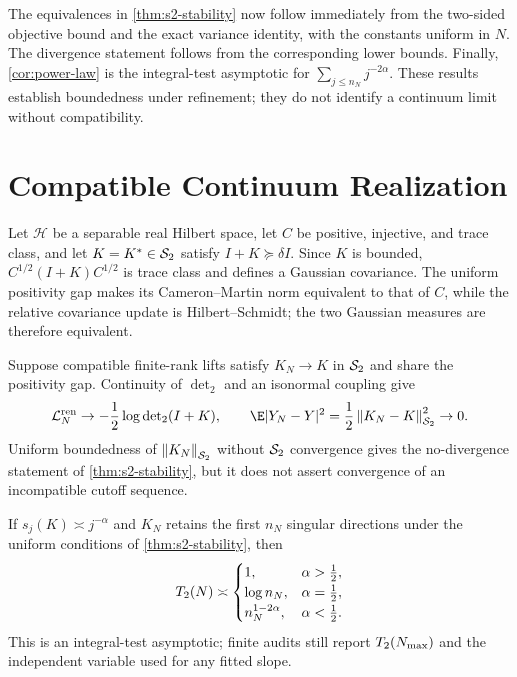 The equivalences in \cref{thm:s2-stability} now follow immediately from the
two-sided objective bound and the exact variance identity, with the constants
uniform in $N$. The divergence statement follows from the corresponding
lower bounds. Finally, \cref{cor:power-law} is the integral-test asymptotic
for $\sum_{j\le n_N}j^{-2\alpha}$. These results establish boundedness under
refinement; they do not identify a continuum limit without compatibility.


\section{Compatible Continuum Realization}
\label{app:continuum-realization}

Let $\mathcal H$ be a separable real Hilbert space, let $C$ be positive,
injective, and trace class, and let $K=K^\ast\in\mathcal{S}_{2}$ satisfy
$I+K\succeq\delta I$. Since $K$ is bounded,
$C^{1/2}(I+K)C^{1/2}$ is trace class and defines a Gaussian covariance. The
uniform positivity gap makes its Cameron--Martin norm equivalent to that of
$C$, while the relative covariance update is Hilbert--Schmidt; the two
Gaussian measures are therefore equivalent.

Suppose compatible finite-rank lifts satisfy $K_N\to K$ in $\mathcal{S}_{2}$
and share the positivity gap. Continuity of $\det_2$ and an isonormal
coupling give
\begin{equation}
  \mathcal L_N^{\mathrm{ren}}\to
  -\frac12\log\det\nolimits_2(I+K),
  \qquad
  \E|Y_N-Y|^2=\frac12\hsnorm{K_N-K}^2\to0.
  \label{eq:compatible-cutoff-convergence}
\end{equation}
Uniform boundedness of $\left\lVert K_N \right\rVert_{\mathcal{S}_{2}}$ without $\mathcal{S}_{2}$ convergence
gives the no-divergence statement of \cref{thm:s2-stability}, but it does not
assert convergence of an incompatible cutoff sequence.

\begin{corollary}
\label{cor:power-law}
If $s_j(K)\asymp j^{-\alpha}$ and $K_N$ retains the first $n_N$ singular
directions under the uniform conditions of \cref{thm:s2-stability}, then
\begin{equation}
  T_2(N)\asymp
  \begin{cases}
    1, & \alpha>\tfrac12,\\
    \log n_N, & \alpha=\tfrac12,\\
    n_N^{1-2\alpha}, & \alpha<\tfrac12.
  \end{cases}
  \label{eq:power-law-phase-transition}
\end{equation}
This is an integral-test asymptotic; finite audits still report
$T_2(N_{\max})$ and the independent variable used for any fitted slope.
\end{corollary}


